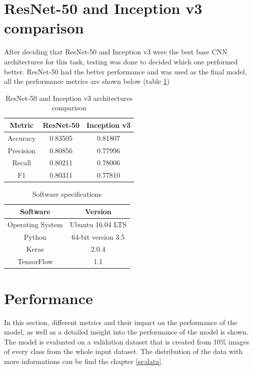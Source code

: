 \documentclass[times, utf8, diplomski]{fer}
\begin{document}
\section{ResNet-50 and Inception v3 comparison}

After deciding that ResNet-50 and Inception v3 were the best base CNN architectures for this task, testing was done to decided which one performed better. ResNet-50 had the better performance and was used as the final model, all the performance metrics are shown below (table \ref{tb:resnet_vs_inceptionv3})

\begin{table}
\centering
\caption{ResNet-50 and Inception v3 architectures comparison}
\label{tb:resnet_vs_inceptionv3}
\begin{tabular}{ccc}
\hline 
Metric & ResNet-50 & Inception v3 \\ \hline 
Accuracy & 0.83505 & 0.81807 \\ 
Precision & 0.80856 & 0.77996 \\ 
Recall & 0.80211 & 0.78006 \\
F1 & 0.80311 &  0.77810 \\
\hline 
\end{tabular} 
\end{table}


\begin{table}
\centering
\caption{Software specifications}
\label{tb:software_specifications}
\begin{tabular}{cc}
\hline 
Software & Version \\ \hline 
Operating System & Ubuntu 16.04 LTS \\ 
Python & 64-bit version 3.5 \\ 
Keras & 2.0.4 \\
TensorFlow & 1.1 \\
\hline 
\end{tabular} 
\end{table}

\section{Performance}

In this section, different metrics and their impact on the performance of the model, as well as a detailed insight into the performance of the model is shown. The model is evaluated on a validation dataset that is created from 10\% images of every class from the whole input dataset. The distribution of the data with more informations can be find the chapter \ref{se:data}.
\end{document}
